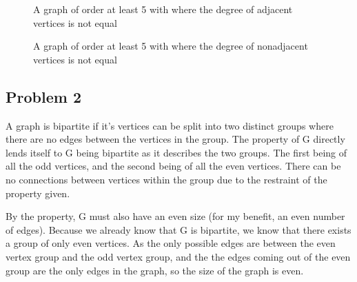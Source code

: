 \documentclass[10pt,a4paper]{article}
\begin{document}
\begin{figure}[h]
    \centering
    \caption{A graph of order at least 5 with where the degree of adjacent vertices is not equal}\label{GraphG}
\end{figure}
\pagebreak
\begin{figure}[h]
    \centering
    \caption{A graph of order at least 5 with where the degree of nonadjacent vertices is not equal}\label{GraphG}
\end{figure}

\subsection*{Problem 2}

A graph is bipartite if it's vertices can be split into two distinct groups where there are no edges between the vertices in the group.
The property of G directly lends itself to G being bipartite as it describes the two groups. The first being of all the odd vertices, and
the second being of all the even vertices. There can be no connections between vertices within the group due to the restraint of the property given.

By the property, G must also have an even size (for my benefit, an even number of edges). Because we already know that G is bipartite,
we know that there exists a group of only even vertices. As the only possible edges are between the even vertex group and the odd vertex group, and 
the the edges coming out of the even group are the only edges in the graph, so the size of the graph is even.
\end{document}
